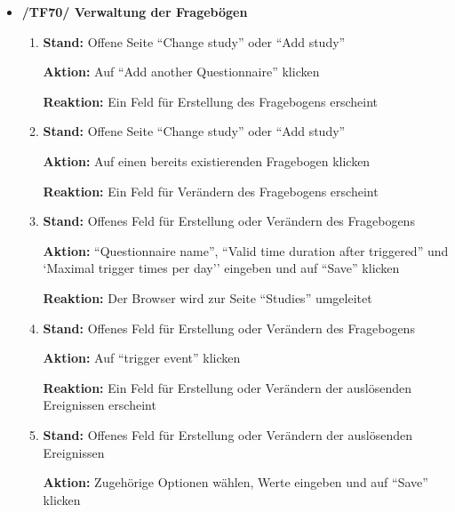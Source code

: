 \documentclass[a4paper]{scrreprt}
\begin{document}
\begin{itemize}
		                      \item \textbf{/TF70/ Verwaltung der Frageb\"ogen}
		                          \begin{enumerate}
		                              \item \par \textbf{Stand: }Offene Seite ``Change study'' oder ``Add study''
		                                    \par \textbf{Aktion: }Auf ``Add another Questionnaire'' klicken
		                                    \par \textbf{Reaktion: }Ein Feld f\"ur Erstellung des Fragebogens erscheint
		      						\item \par \textbf{Stand: }Offene Seite ``Change study'' oder ``Add study''
		                                    \par \textbf{Aktion: }Auf einen bereits existierenden Fragebogen klicken
		                                    \par \textbf{Reaktion: }Ein Feld f\"ur Ver\"andern des Fragebogens erscheint                              
		                              \item \par \textbf{Stand: }Offenes Feld f\"ur Erstellung oder Ver\"andern des Fragebogens
		                                    \par \textbf{Aktion: }``Questionnaire name'', ``Valid time duration after triggered'' und `Maximal trigger times per day'' eingeben und auf ``Save'' klicken
		                                    \par \textbf{Reaktion: }Der Browser wird zur Seite ``Studies'' umgeleitet   
		                              \item \par \textbf{Stand: }Offenes Feld f\"ur Erstellung oder Ver\"andern des Fragebogens
		                                    \par \textbf{Aktion: }Auf ``trigger event'' klicken
		                                    \par \textbf{Reaktion: }Ein Feld f\"ur Erstellung oder Ver\"andern der ausl\"osenden Ereignissen erscheint  
		                              \item \par \textbf{Stand: }Offenes Feld f\"ur Erstellung oder Ver\"andern der ausl\"osenden Ereignissen
		                                    \par \textbf{Aktion: }Zugeh\"orige Optionen w\"ahlen, Werte eingeben und auf ``Save'' klicken

\end{enumerate}
\end{itemize}
\end{document}
